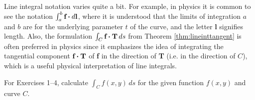 Line integral notation varies quite a bit. For example, in physics it is common to see the notation
$\int_a^b \textbf{f} \bm{\cdot} d\textbf{l}$, where it is understood that the limits of integration $a$ and $b$ are for
the underlying parameter $t$ of the curve, and the letter \textbf{l} signifies length. Also, the formulation
$\int_C \textbf{f} \bm{\cdot} \textbf{T}\,ds$ from Theorem \ref{thm:lineinttangent} is often preferred in physics since
it emphasizes the idea of integrating the tangential component $\textbf{f} \bm{\cdot} \textbf{T}$ of \textbf{f} in the
direction of \textbf{T} (i.e. in the direction of $C$), which is a useful physical interpretation of line integrals.
\newpage
\centerline{}\label{sec4dot1}
\par\noindent For Exercises 1--4, calculate $\int_C f(x,y)\,ds$ for the given function $f(x,y)$ and
curve $C$.
